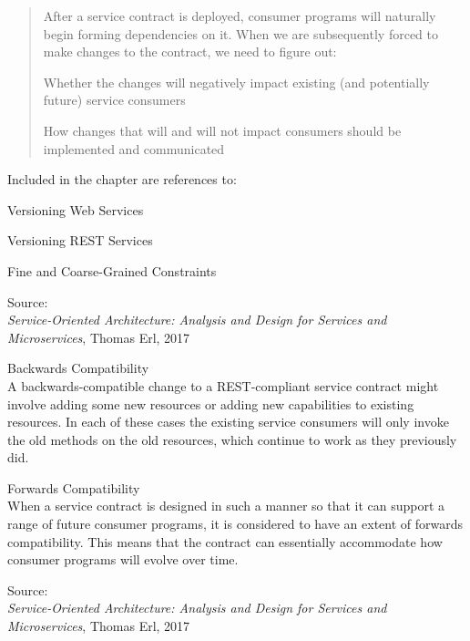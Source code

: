 \documentclass[Screen16to9,17pt]{foils}
\begin{document}

\begin{quote}
After a service contract is deployed, consumer programs will naturally begin forming dependencies on it. When we are subsequently forced to make changes to the contract, we need to figure out:
\begin{list2}
\item Whether the changes will negatively impact existing (and potentially future) service consumers
\item How changes that will and will not impact consumers should be implemented and communicated
\end{list2}
\end{quote}

Included in the chapter are references to:
\begin{list2}
\item Versioning Web Services
\item Versioning REST Services
\item Fine and Coarse-Grained Constraints
\end{list2}
Source: {\footnotesize\\
\emph{Service‑Oriented Architecture: Analysis and Design for Services and Microservices}, Thomas Erl, 2017}


\begin{list2}
\item Backwards Compatibility\\
A backwards-compatible change to a REST-compliant service contract might involve adding some new resources or adding new capabilities to existing resources. In each of these cases the existing service consumers will only invoke the old methods on the old resources, which continue to work as they previously did.
\item Forwards Compatibility\\
When a service contract is designed in such a manner so that it can support a range of future consumer programs, it is considered to have an extent of forwards compatibility. This means that the contract can essentially accommodate how consumer programs will evolve over time.
\end{list2}

Source: {\footnotesize\\
\emph{Service‑Oriented Architecture: Analysis and Design for Services and Microservices}, Thomas Erl, 2017}
\end{document}
